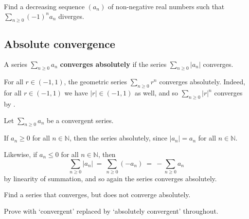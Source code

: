 \begin{exercise}
Find a decreasing sequence $(a_n)$ of non-negative real numbers such that $\displaystyle \sum_{n \ge 0} (-1)^n a_n$ diverges.
\end{exercise}

\subsection*{Absolute convergence}

\begin{definition}
\label{defAbsoluteConvergence}
A series $\displaystyle \sum_{n \ge 0} a_n$ \textbf{converges absolutely} if the series $\displaystyle \sum_{n \ge 0} |a_n|$ converges.
\end{definition}

\begin{example}
\label{exGeometricSeriesConvergesAbsolutely}
For all $r \in (-1,1)$, the geometric series $\displaystyle \sum_{n \ge 0} r^n$ converges absolutely. Indeed, for all $r \in (-1,1)$ we have $|r| \in (-1,1)$ as well, and so $\displaystyle \sum_{n \ge 0} |r|^n$ converges by . 
\end{example}

\begin{example}
Let $\displaystyle \sum_{n \ge 0} a_n$ be a convergent series.

If $a_n \ge 0$ for all $n \in \mathbb{N}$, then the series absolutely, since $|a_n| = a_n$ for all $n \in \mathbb{N}$.

Likewise, if $a_n \le 0$ for all $n \in \mathbb{N}$, then
\[ \sum_{n \ge 0} |a_n| ~=~ \sum_{n \ge 0} (-a_n) ~=~ -\sum_{n \ge 0} a_n \]
by linearity of summation, and so again the series converges absolutely.
\end{example}

\begin{exercise}
Find a series that converges, but does not converge absolutely.
\end{exercise}

\begin{exercise}
Prove  with `convergent' replaced by `absolutely convergent' throughout.
\end{exercise}

